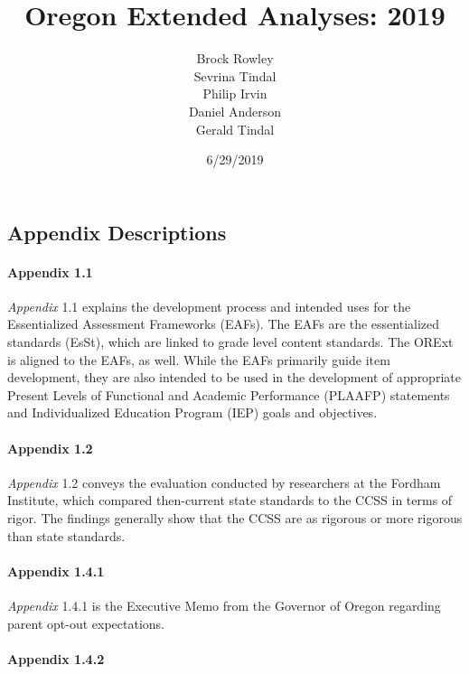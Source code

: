 \documentclass[]{article}
\title{Oregon Extended Analyses: 2019}
\author{Brock Rowley \\ Sevrina Tindal \\ Philip Irvin \\ Daniel Anderson \\ Gerald Tindal}
\date{6/29/2019}
\let\oldparagraph\paragraph
\renewcommand{\paragraph}[1]{\oldparagraph{#1}\mbox{}}
\begin{document}
\maketitle

{
\setcounter{tocdepth}{5}
\tableofcontents
}
\hypertarget{appendix-descriptions}{%
\subsection{Appendix Descriptions}\label{appendix-descriptions}}

\hypertarget{appendix-1.1}{%
\paragraph{Appendix 1.1}\label{appendix-1.1}}

\emph{Appendix} 1.1 explains the development process and intended uses
for the Essentialized Assessment Frameworks (EAFs). The EAFs are the
essentialized standards (EsSt), which are linked to grade level content
standards. The ORExt is aligned to the EAFs, as well. While the EAFs
primarily guide item development, they are also intended to be used in
the development of appropriate Present Levels of Functional and Academic
Performance (PLAAFP) statements and Individualized Education Program
(IEP) goals and objectives. \newpage

\hypertarget{appendix-1.2}{%
\paragraph{Appendix 1.2}\label{appendix-1.2}}

\emph{Appendix} 1.2 conveys the evaluation conducted by researchers at
the Fordham Institute, which compared then-current state standards to
the CCSS in terms of rigor. The findings generally show that the CCSS
are as rigorous or more rigorous than state standards.

\hypertarget{appendix-1.4.1}{%
\paragraph{Appendix 1.4.1}\label{appendix-1.4.1}}

\emph{Appendix} 1.4.1 is the Executive Memo from the Governor of Oregon
regarding parent opt-out expectations.

\hypertarget{appendix-1.4.2}{%
\paragraph{Appendix 1.4.2}\label{appendix-1.4.2}}
\end{document}
